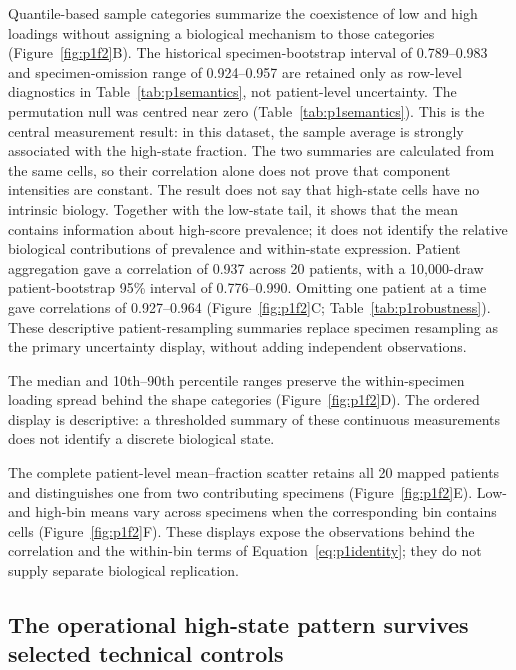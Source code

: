 \documentclass[10pt,a4paper]{article}
\begin{document}
Quantile-based sample categories summarize the coexistence of low and high loadings without assigning a biological mechanism to those categories (Figure~\ref{fig:p1f2}B). The historical specimen-bootstrap interval of 0.789--0.983 and specimen-omission range of 0.924--0.957 are retained only as row-level diagnostics in Table~\ref{tab:p1semantics}, not patient-level uncertainty. The permutation null was centred near zero (Table~\ref{tab:p1semantics}). This is the central measurement result: in this dataset, the sample average is strongly associated with the high-state fraction. The two summaries are calculated from the same cells, so their correlation alone does not prove that component intensities are constant. The result does not say that high-state cells have no intrinsic biology. Together with the low-state tail, it shows that the mean contains information about high-score prevalence; it does not identify the relative biological contributions of prevalence and within-state expression. Patient aggregation gave a correlation of 0.937 across 20 patients, with a 10,000-draw patient-bootstrap 95\% interval of 0.776--0.990. Omitting one patient at a time gave correlations of 0.927--0.964 (Figure~\ref{fig:p1f2}C; Table~\ref{tab:p1robustness}). These descriptive patient-resampling summaries replace specimen resampling as the primary uncertainty display, without adding independent observations.

The median and 10th--90th percentile ranges preserve the within-specimen loading spread behind the shape categories (Figure~\ref{fig:p1f2}D). The ordered display is descriptive: a thresholded summary of these continuous measurements does not identify a discrete biological state.

The complete patient-level mean--fraction scatter retains all 20 mapped patients and distinguishes one from two contributing specimens (Figure~\ref{fig:p1f2}E). Low- and high-bin means vary across specimens when the corresponding bin contains cells (Figure~\ref{fig:p1f2}F). These displays expose the observations behind the correlation and the within-bin terms of Equation~\eqref{eq:p1identity}; they do not supply separate biological replication.

\subsection{The operational high-state pattern survives selected technical controls}
\end{document}
